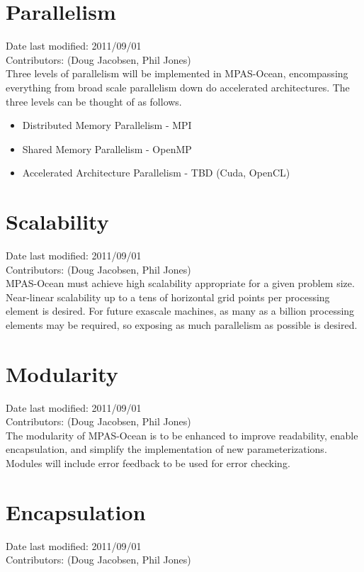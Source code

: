 \documentclass[11pt]{report}
\begin{document}
\section{Parallelism}
Date last modified: 2011/09/01 \\
Contributors: (Doug Jacobsen, Phil Jones) \\

Three levels of parallelism will be implemented in MPAS-Ocean, encompassing everything from broad scale parallelism down do accelerated architectures. The three levels can be thought of as follows.

\begin{itemize}
	\item Distributed Memory Parallelism - MPI
	\item Shared Memory Parallelism - OpenMP
	\item Accelerated Architecture Parallelism - TBD (Cuda, OpenCL)
\end{itemize}

\section{Scalability}
Date last modified: 2011/09/01 \\
Contributors: (Doug Jacobsen, Phil Jones) \\

MPAS-Ocean must achieve high scalability appropriate for a given problem size.  Near-linear scalability up to a tens of horizontal grid points per processing element is desired.  For future exascale machines, as many as a billion processing elements may be required, so exposing as much parallelism as possible is desired.  

\section{Modularity}
Date last modified: 2011/09/01 \\
Contributors: (Doug Jacobsen, Phil Jones) \\

The modularity of MPAS-Ocean is to be enhanced to improve readability, enable encapsulation, and simplify the implementation of new parameterizations. Modules will include error feedback to be used for error checking.

\section{Encapsulation}
Date last modified: 2011/09/01 \\
Contributors: (Doug Jacobsen, Phil Jones) \\
\end{document}
